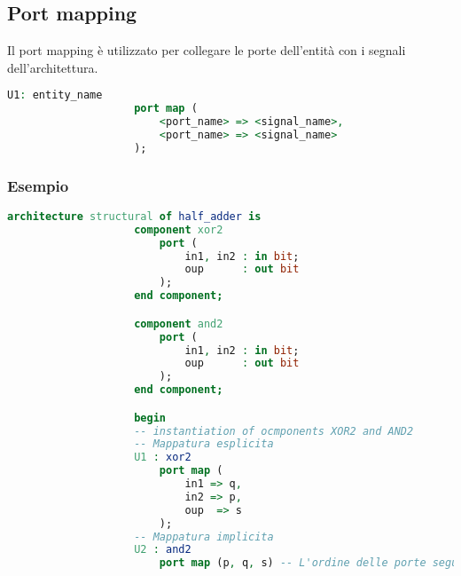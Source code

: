         
        \subsection{Port mapping}
            Il port mapping è utilizzato per collegare le porte dell'entità con i segnali dell'architettura.
            \begin{lstlisting}[language=VHDL]
                U1: entity_name
                    port map (
                        <port_name> => <signal_name>,
                        <port_name> => <signal_name>
                    );
            \end{lstlisting}

            \subsubsection{Esempio}
            \begin{lstlisting}[language=VHDL, numberstyle=\tiny\color{gray}\highlightlines{3,4,5,6,19,20,21,22,23,24}{yellow}, numberstyle=\tiny\color{gray}\highlightlines{10,11,12,13,26,27}{green}]
                architecture structural of half_adder is
                    component xor2
                        port (
                            in1, in2 : in bit;
                            oup      : out bit
                        );
                    end component;

                    component and2
                        port (
                            in1, in2 : in bit;
                            oup      : out bit
                        );
                    end component;

                    begin
                    -- instantiation of ocmponents XOR2 and AND2
                    -- Mappatura esplicita
                    U1 : xor2
                        port map (
                            in1 => q,
                            in2 => p,
                            oup  => s
                        );
                    -- Mappatura implicita
                    U2 : and2
                        port map (p, q, s) -- L'ordine delle porte segue quello della dichiarazione del componente!
            \end{lstlisting}


